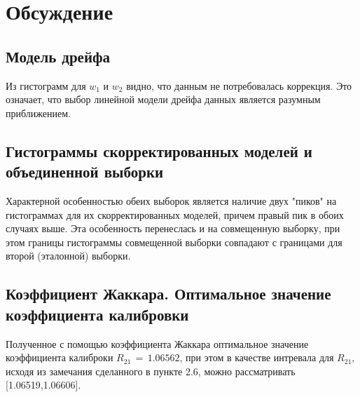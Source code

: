 \section{Обсуждение}
\subsection{Модель дрейфа}
\begin{flushleft}
	Из гистограмм для $w_1$ и $w_2$ видно, что данным не потребовалась коррекция. Это означает, что выбор линейной модели дрейфа данных является разумным приближением.
\end{flushleft}

\subsection{Гистограммы скорректированных моделей и объединенной выборки}
\begin{flushleft}
	Характерной особенностью обеих выборок является наличие двух "пиков" на гистограммах для их скорректированных моделей, причем правый пик в обоих случаях выше. Эта особенность перенеслась и на совмещенную выборку, при этом границы гистограммы совмещенной выборки совпадают с границами для второй (эталонной) выборки.
\end{flushleft}

\subsection{Коэффициент Жаккара. Оптимальное значение коэффициента калибровки}
\begin{flushleft}
	Полученное с помощью коэффициента Жаккара оптимальное значение коэффициента калиброки $R_{21} \,=\, 1.06562$, при этом в качестве интревала для $R_{21}$, исходя из замечания сделанного в пункте 2.6, можно рассматривать [1.06519,1.06606].
\end{flushleft}